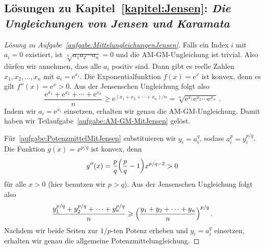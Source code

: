 \subsection*{Lösungen zu Kapitel~\ref{kapitel:Jensen}: \emph{Die Ungleichungen von Jensen und Karamata}}

\begin{proof}[Lösung zu Aufgabe~\ref{aufgabe:MittelungleichungenJensen}]
	Falls ein Index $i$ mit $a_i=0$ existiert, ist $\sqrt[n]{a_1a_2\dotsm a_n}=0$ und die AM-GM-Ungleichung ist trivial. Also dürfen wir annehmen, dass alle $a_i$ positiv sind. Dann gibt es reelle Zahlen $x_1,x_2,\dotsc,x_n$ mit $a_i=\mathrm{e}^{x_i}$. Die Exponentialfunktion $f(x)=\mathrm{e}^x$ ist konvex, denn es gilt $f''(x)=\mathrm{e}^x>0$. Aus der Jensenschen Ungleichung folgt also
	\begin{equation*}
		\frac{\mathrm{e}^{x_1}+\mathrm{e}^{x_2}+\dotsb+\mathrm{e}^{x_n}}{n}\geqslant \mathrm{e}^{(x_1+x_2+\dotsb+x_n)/n}=\sqrt[n]{\mathrm{e}^{x_1}\mathrm{e}^{x_2}\dotsm \mathrm{e}^{x_n}}\,.
	\end{equation*}
	Indem wir $a_i=\mathrm{e}^{x_i}$ einsetzen, erhalten wir genau die AM-GM-Ungleichung. Damit haben wir Teilaufgabe~\ref{aufgabe:AM-GM-MitJensen} gelöst.
	
	Für~\ref{aufgabe:PotenzmittelMitJensen} substituieren wir $y_i=a_i^q$, sodass $a_i^p=y_i^{p/q}$. Die Funktion $g(x)=x^{p/q}$ ist konvex, denn
	\begin{equation*}
		g''(x)=\frac pq\parens*{\frac pq-1}x^{p/q-2}>0
	\end{equation*}
	für alle $x>0$ (hier benutzen wir $p>q$). Aus der Jensenschen Ungleichung folgt also
	\begin{equation*}
		\frac{y_1^{p/q}+y_2^{p/q}+\dotsb+y_n^{p/q}}{n}\geqslant \parens*{\frac{y_1+y_2+\dotsb+y_n}{n}}^{p/q}\,.
	\end{equation*}
	Nachdem wir beide Seiten zur $1/p$-ten Potenz erheben und $y_i=a_i^q$ einsetzen, erhalten wir genau die allgemeine Potenzmittelungleichung.
\end{proof}

